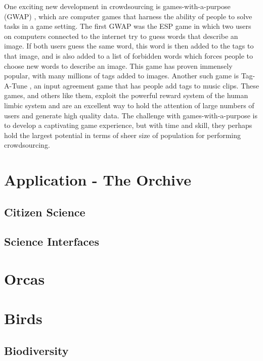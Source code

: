 One exciting new development in crowdsourcing is games-with-a-purpose
(GWAP) \cite{vonahn08}, which are computer games that harness the
ability of people to solve tasks in a game setting.  The first GWAP
was the ESP game \cite{vonahn04} in which two users on computers
connected to the internet try to guess words that describe an image.
If both users guess the same word, this word is then added to the tags
to that image, and is also added to a list of forbidden words which
forces people to choose new words to describe an image.  This game has
proven immensely popular, with many millions of tags added to images.
Another such game is Tag-A-Tune \cite{law09}, an input agreement game
that has people add tags to music clips.  These games, and others like
them, exploit the powerful reward system of the human limbic system
and are an excellent way to hold the attention of large numbers of
users and generate high quality data.  The challenge with
games-with-a-purpose is to develop a captivating game experience, but
with time and skill, they perhaps hold the largest potential in terms
of sheer size of population for performing crowdsourcing.

\section{Application - The Orchive}



\subsection{Citizen Science}

\subsection{Science Interfaces}


\section{Orcas}



\section{Birds}

\subsection{Biodiversity}




